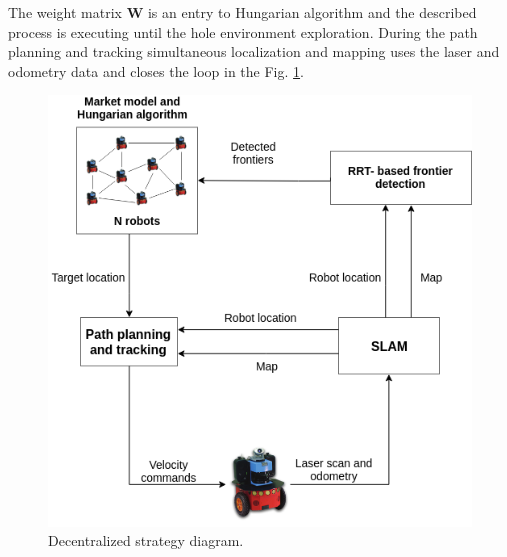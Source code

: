 \documentclass[letterpaper, 10 pt, conference]{ieeeconf}  %
\begin{document}
The weight matrix $\boldsymbol{W}$ is an entry to Hungarian algorithm and the described process is executing until the hole environment exploration. During the path planning and tracking simultaneous localization and mapping uses the laser and odometry data and closes the loop in the Fig. \ref{fig:implementation-diagram}.

\begin{figure}[H]
	\centering\includegraphics[width=1.0\columnwidth]{Impementationdiagram.png}
	\caption{Decentralized strategy diagram.}
	\label{fig:implementation-diagram}
\end{figure}
\end{document}
